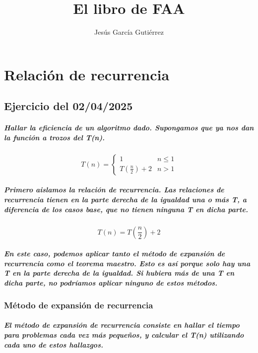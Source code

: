 \documentclass{book}
\title{El libro de FAA}
\date{}
\author{Jesús García Gutiérrez}
\begin{document}
	\maketitle{}
	\chapter{Relación de recurrencia}
	\section{Ejercicio del 02/04/2025}
	\paragraph{Hallar la eficiencia de un algoritmo dado. Supongamos que ya nos dan la función a trozos del T(n).}
	\[ T(n) = 	\begin{cases} 
					1 & n\leq 1 \\
					T(\frac{n}{2}) + 2 & n > 1 
				\end{cases}
       \]
       \paragraph{Primero aislamos la relación de recurrencia. Las relaciones de recurrencia tienen en la parte derecha de la igualdad una o más T, a diferencia de los casos base, que no tienen ninguna T en dicha parte.}
      \begin{equation}
	      T(n) = T(\frac{n}{2}) + 2  
      \end{equation}
      \paragraph{En este caso, podemos aplicar tanto el método de expansión de recurrencia como el teorema maestro. Esto es así porque solo hay una T en la parte derecha de la igualdad. Si hubiera más de una T en dicha parte, no podríamos aplicar ninguno de estos métodos.}
      \subsection{Método de expansión de recurrencia}
      \paragraph{El método de expansión de recurrencia consiste en hallar el tiempo para problemas cada vez más pequeños, y calcular el T(n) utilizando cada uno de estos hallazgos.}
\end{document}
